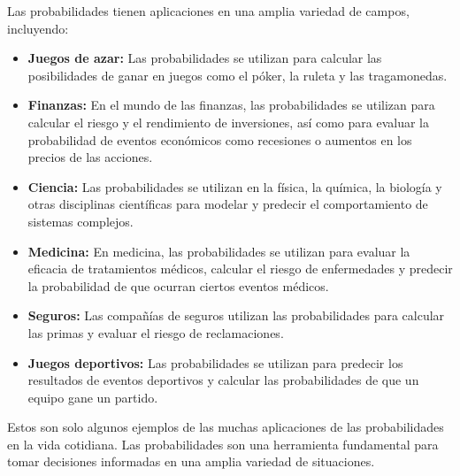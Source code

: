 Las probabilidades tienen aplicaciones en una amplia variedad de campos, incluyendo:

\begin{itemize}
	\item \textbf{ Juegos de azar:} Las probabilidades se utilizan para calcular las posibilidades de ganar en juegos como el póker, la ruleta y las tragamonedas.
	\item \textbf{Finanzas:}  En el mundo de las finanzas, las probabilidades se utilizan para calcular el riesgo y el rendimiento de inversiones, así como para evaluar la probabilidad de eventos económicos como recesiones o aumentos en los precios de las acciones.
	\item \textbf{Ciencia:} Las probabilidades se utilizan en la física, la química, la biología y otras disciplinas científicas para modelar y predecir el comportamiento de sistemas complejos.
	\item \textbf{Medicina:} En medicina, las probabilidades se utilizan para evaluar la eficacia de tratamientos médicos, calcular el riesgo de enfermedades y predecir la probabilidad de que ocurran ciertos eventos médicos.
	\item \textbf{Seguros:} Las compañías de seguros utilizan las probabilidades para calcular las primas y evaluar el riesgo de reclamaciones.
	\item \textbf{Juegos deportivos:} Las probabilidades se utilizan para predecir los resultados de eventos deportivos y calcular las probabilidades de que un equipo gane un partido.
\end{itemize}

Estos son solo algunos ejemplos de las muchas aplicaciones de las probabilidades en la vida cotidiana. Las probabilidades son una herramienta fundamental para tomar decisiones informadas en una amplia variedad de situaciones.